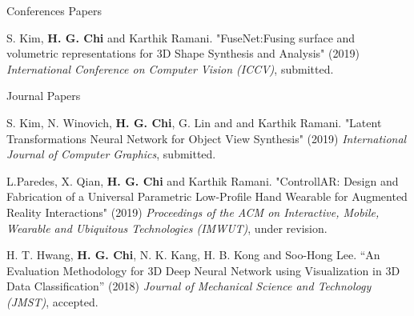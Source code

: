 


\begin{cventries}

\cvpub
{Conferences Papers} %
{ %
\begin{cvitems}
\item {S. Kim, \textbf{H. G. Chi} and Karthik Ramani. "FuseNet:Fusing surface and volumetric representations for 3D Shape Synthesis and Analysis" (2019) \textit{International Conference on Computer Vision (ICCV)}, submitted.}
\end{cvitems}
}


\cvpub
{Journal Papers} %
{ %
\begin{cvitems}
\item {S. Kim, N. Winovich, \textbf{H. G. Chi}, G. Lin and and Karthik Ramani. "Latent Transformations Neural Network for Object View Synthesis" (2019) \textit{International Journal of Computer Graphics}, submitted.}
\item {L.Paredes, X. Qian, \textbf{H. G. Chi} and Karthik Ramani. "ControllAR: Design and Fabrication of a Universal Parametric Low-Profile Hand Wearable for Augmented Reality Interactions" (2019) \textit{Proceedings of the ACM on Interactive, Mobile, Wearable and Ubiquitous Technologies (IMWUT)}, under revision.}
\item {H. T. Hwang, \textbf{H. G. Chi}, N. K. Kang, H. B. Kong and Soo-Hong Lee. “An Evaluation Methodology for 3D Deep Neural Network using Visualization in 3D Data Classification” (2018) \textit{Journal of Mechanical Science and Technology (JMST)}, accepted.}
\end{cvitems}
}


\end{cventries}